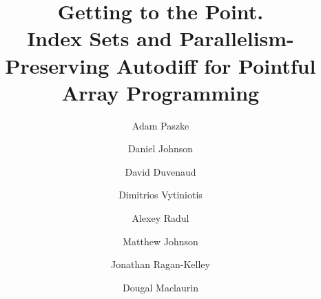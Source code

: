 \documentclass[acmsmall,screen,nonacm]{acmart}
\begin{document}
\title[Getting to the Point.]{Getting to the Point. \\
\small Index Sets and Parallelism-Preserving Autodiff for Pointful Array Programming}

\author{Adam Paszke}

\author{Daniel Johnson}

\author{David Duvenaud}

\author{Dimitrios Vytiniotis}

\author{Alexey Radul}

\author{Matthew Johnson}

\author{Jonathan Ragan-Kelley}

\author{Dougal Maclaurin}

\renewcommand{\shortauthors}{Paszke, Johnson, Duvenaud, Vytiniotis, Radul, Johnson, Ragan-Kelley, Maclaurin}
\end{document}
